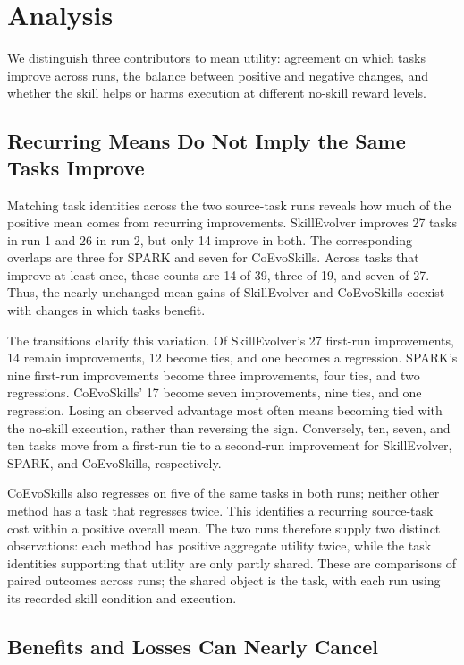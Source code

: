 \section{Analysis}
\label{sec:analysis}

We distinguish three contributors to mean utility: agreement on which tasks improve across runs, the balance between positive and negative changes, and whether the skill helps or harms execution at different no-skill reward levels.

\subsection{Recurring Means Do Not Imply the Same Tasks Improve}

Matching task identities across the two source-task runs reveals how much of the positive mean comes from recurring improvements. SkillEvolver improves 27 tasks in run 1 and 26 in run 2, but only 14 improve in both. The corresponding overlaps are three for SPARK and seven for CoEvoSkills. Across tasks that improve at least once, these counts are 14 of 39, three of 19, and seven of 27. Thus, the nearly unchanged mean gains of SkillEvolver and CoEvoSkills coexist with changes in which tasks benefit.

The transitions clarify this variation. Of SkillEvolver's 27 first-run improvements, 14 remain improvements, 12 become ties, and one becomes a regression. SPARK's nine first-run improvements become three improvements, four ties, and two regressions. CoEvoSkills' 17 become seven improvements, nine ties, and one regression. Losing an observed advantage most often means becoming tied with the no-skill execution, rather than reversing the sign. Conversely, ten, seven, and ten tasks move from a first-run tie to a second-run improvement for SkillEvolver, SPARK, and CoEvoSkills, respectively.

CoEvoSkills also regresses on five of the same tasks in both runs; neither other method has a task that regresses twice. This identifies a recurring source-task cost within a positive overall mean. The two runs therefore supply two distinct observations: each method has positive aggregate utility twice, while the task identities supporting that utility are only partly shared. These are comparisons of paired outcomes across runs; the shared object is the task, with each run using its recorded skill condition and execution.

\subsection{Benefits and Losses Can Nearly Cancel}

